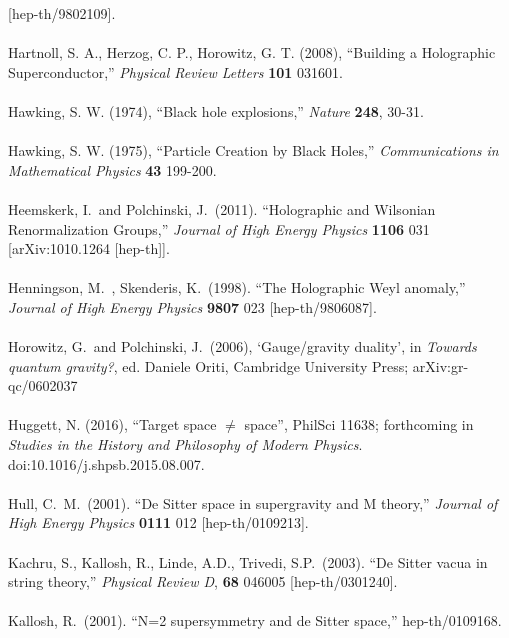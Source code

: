 \documentclass[12pt]{article}
\renewcommand{\^}[1]{\hat{#1}}
\begin{document}
  [hep-th/9802109].\\
\\
Hartnoll, S. A., Herzog, C. P., Horowitz, G. T. (2008), ``Building a Holographic Superconductor,'' {\it Physical Review Letters} \textbf{101} 031601.\\
\\
Hawking, S. W. (1974), ``Black hole explosions,'' {\it Nature} \textbf{248}, 30-31.\\
\\
Hawking, S. W. (1975), ``Particle Creation by Black Holes,'' {\it Communications in Mathematical Physics} \textbf{43}  199-200. \\
\\
Heemskerk, I.~and Polchinski, J.~(2011). ``Holographic and Wilsonian Renormalization Groups,''
  {\it Journal of High Energy Physics} {\bf 1106} 031
  [arXiv:1010.1264 [hep-th]].\\
\\
Henningson, M.~, Skenderis, K.~(1998). ``The Holographic Weyl anomaly,''  {\it Journal of High Energy Physics} {\bf 9807}  023
  [hep-th/9806087].\\
\\
Horowitz, G.~and Polchinski, J.~(2006), `Gauge/gravity duality', in {\em Towards quantum gravity?}, ed. Daniele Oriti, Cambridge University Press; arXiv:gr-qc/0602037\\
\\
  Huggett, N. (2016), ``Target space $\neq$ space'', PhilSci 11638; forthcoming in {\em Studies in the History and Philosophy of Modern Physics}. doi:10.1016/j.shpsb.2015.08.007.\\
\\
Hull, C.~M.~(2001). ``De Sitter space in supergravity and M theory,''
  {\it Journal of High Energy Physics} {\bf 0111} 012
  [hep-th/0109213].\\
\\
Kachru, S., Kallosh, R., Linde, A.D., Trivedi, S.P.~(2003). ``De Sitter vacua in string theory,''
  {\it Physical Review D}, {\bf 68} 046005
  [hep-th/0301240].\\
\\
Kallosh, R.~(2001). ``N=2 supersymmetry and de Sitter space,''
  hep-th/0109168.\\
\\
\end{document}
